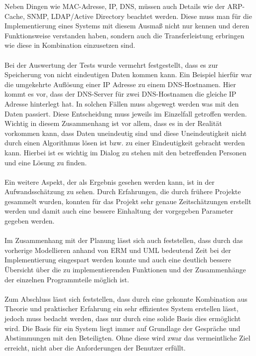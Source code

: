 Neben Dingen wie MAC-Adresse, IP, DNS, müssen auch Details wie der ARP-Cache, SNMP, LDAP/Active Directory beachtet werden.
Diese muss man für die Implementierung eines Systems mit diesem Ausmaß nicht nur kennen und deren Funktionsweise verstanden haben, sondern auch die Transferleistung erbringen wie diese in Kombination einzusetzen sind.\\\\
Bei der Auswertung der Tests wurde vermehrt festgestellt, dass es zur Speicherung von nicht eindeutigen Daten kommen kann.
Ein Beispiel hierfür war die umgekehrte Auflösung einer IP Adresse zu einem DNS-Hostnamen.
Hier kommt es vor, dass der DNS-Server für zwei DNS-Hostnamen die gleiche IP Adresse hinterlegt hat.
In solchen Fällen muss abgewegt werden was mit den Daten passiert. Diese Entscheidung muss jeweils im Einzelfall getroffen werden.
Wichtig in diesem Zusammenhang ist vor allem, dass es in der Realität vorkommen kann, dass Daten uneindeutig sind und diese Uneindeutigkeit nicht durch einen Algorithmus lösen ist bzw. zu einer Eindeutigkeit gebracht werden kann.
Hierbei ist es wichtig im Dialog zu stehen mit den betreffenden Personen und eine Lösung zu finden.\\\\
Ein weitere Aspekt, der als Ergebnis gesehen werden kann, ist in der Aufwandsschätzung zu sehen.
Durch Erfahrungen, die durch frühere Projekte gesammelt wurden, konnten für das Projekt sehr genaue Zeitschätzungen erstellt werden und damit auch eine bessere Einhaltung der vorgegeben Parameter gegeben werden.\\\\
Im Zusammenhang mit der Planung lässt sich auch feststellen, dass durch das vorherige Modellieren anhand von ERM und UML bedeutend Zeit bei der Implementierung eingespart werden konnte und auch eine deutlich bessere Übersicht über die zu implementierenden Funktionen und der Zusammenhänge der einzelnen Programmteile möglich ist.\\\\
Zum Abschluss lässt sich feststellen, dass durch eine gekonnte Kombination aus Theorie und praktischer Erfahrung ein sehr effizientes System erstellen lässt, jedoch muss bedacht werden, dass nur durch eine solide Basis dies ermöglicht wird.
Die Basis für ein System liegt immer auf Grundlage der Gespräche und Abstimmungen mit den Beteiligten. Ohne diese wird zwar das vermeintliche Ziel erreicht, nicht aber die Anforderungen der Benutzer erfüllt.